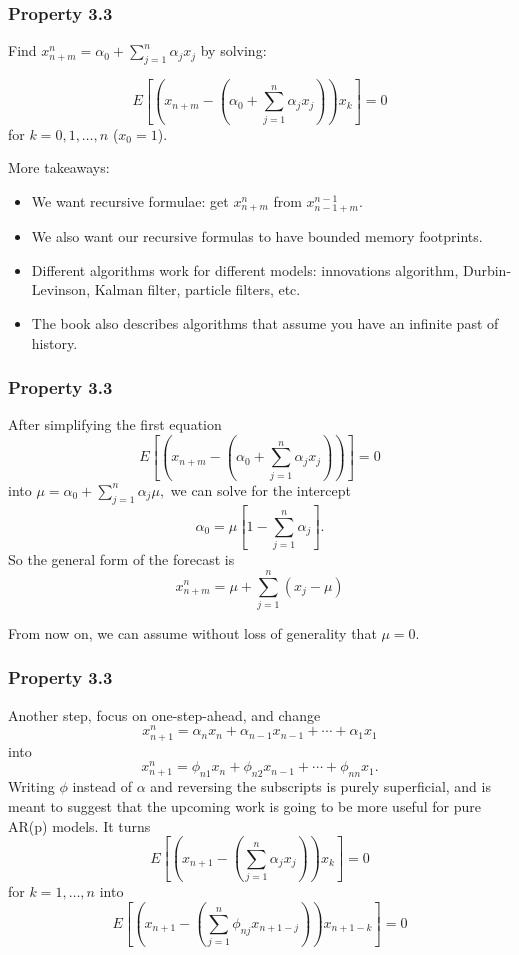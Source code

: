 \documentclass[%
xcolor=pdftex]{beamer}
\begin{document}
\begin{frame}
\frametitle{Property 3.3}

Find $x_{n+m}^n = \alpha_0 + \sum_{j=1}^n \alpha_j x_j$ by solving: 

$$
E\left[ \left(x_{n+m} - \left( \alpha_0 + \sum_{j=1}^n \alpha_j x_j\right) \right)x_k \right] = 0 
$$
for $k=0,1,\ldots, n$ ($x_0 = 1$).

More takeaways:

\begin{itemize}
\item We want recursive formulae: get $x_{n+m}^n$ from $x_{n-1+m}^{n-1}$.
\item We also want our recursive formulas to have bounded memory footprints.
\item Different algorithms work for different models: innovations algorithm, Durbin-Levinson, Kalman filter, particle filters, etc.
\item The book also describes algorithms that assume you have an infinite past of history.
\end{itemize}

\end{frame}




\begin{frame}
\frametitle{Property 3.3}

After simplifying the first equation
$$
E\left[ \left(x_{n+m} - \left( \alpha_0 + \sum_{j=1}^n \alpha_j x_j\right) \right) \right] = 0
$$
into $\mu = \alpha_0 + \sum_{j=1}^n \alpha_j \mu,$ we can solve for the intercept
$$
\alpha_0 = \mu\left[1 - \sum_{j=1}^n \alpha_j \right].
$$
So the general form of the forecast is 
$$
x_{n+m}^n = \mu + \sum_{j=1}^n (x_j - \mu)
$$

From now on, we can assume without loss of generality that $\mu = 0$.
\end{frame}


\begin{frame}
\frametitle{Property 3.3}

Another step, focus on one-step-ahead, and change 
$$
x_{n+1}^n = \alpha_n x_n + \alpha_{n-1}x_{n-1} + \cdots + \alpha_1 x_1
$$
into
$$
x_{n+1}^n = \phi_{n1} x_n + \phi_{n2}x_{n-1} + \cdots + \phi_{nn} x_1.
$$
Writing $\phi$ instead of $\alpha$ and reversing the subscripts is purely superficial, and is meant to suggest that the upcoming work is going to be more useful for pure AR(p) models. It turns 
$$
E\left[ \left(x_{n+1} - \left( \sum_{j=1}^n \alpha_j x_j\right) \right)x_k \right] = 0
$$
for $k=1,\ldots,n$ into 
$$
E\left[ \left(x_{n+1} - \left( \sum_{j=1}^n \phi_{nj} x_{n+1-j}\right)\right) x_{n+1-k}  \right] = 0
$$


\end{frame}
\end{document}
